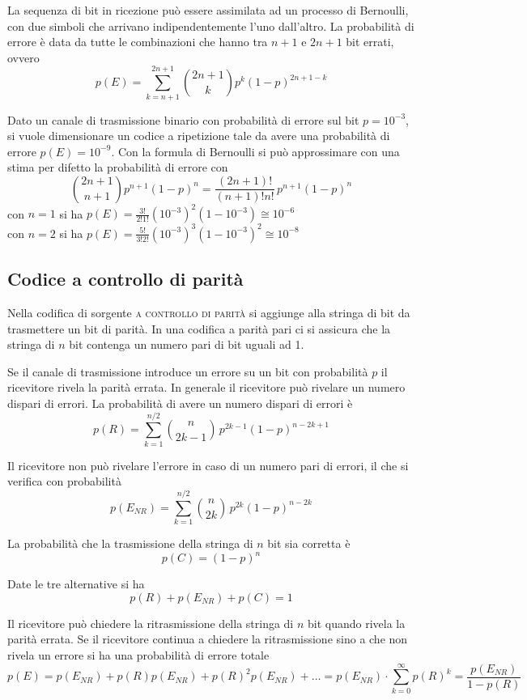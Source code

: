 La sequenza di bit in ricezione può essere assimilata ad un processo di Bernoulli, con due simboli che arrivano indipendentemente l'uno dall'altro. La probabilità di errore è data da tutte le combinazioni che hanno tra $n+1$ e $2n+1$ bit errati, ovvero
\[p(E)=\sum_{k=n+1}^{2n+1}\binom{2n+1}{k}p^k(1-p)^{2n+1-k}\]

\begin{esempio}
Dato un canale di trasmissione binario con probabilità di errore sul bit $p=10^{-3}$, si vuole dimensionare un codice a ripetizione tale da avere una probabilità di errore $p(E)=10^{-9}$.
Con la formula di Bernoulli si può approssimare con una stima per difetto la probabilità di errore con \[\binom{2n+1}{n+1}p^{n+1}(1-p)^n=\frac{(2n+1)!}{(n+1)!n!}\,p^{n+1}(1-p)^n\]
con $n=1$ si ha $p(E)=\frac{3!}{2!1!}(10^{-3})^2(1-10^{-3})\cong 10^{-6}$\\
con $n=2$ si ha $p(E)=\frac{5!}{3!2!}(10^{-3})^3(1-10^{-3})^2\cong 10^{-8}$\\
\end{esempio}

\subsection{Codice a controllo di parità}
Nella codifica di sorgente \textsc{a controllo di parità} si aggiunge alla stringa di bit da trasmettere un bit di parità. In una codifica a parità pari ci si assicura che la stringa di $n$ bit contenga un numero pari di bit uguali ad 1.

Se il canale di trasmissione introduce un errore su un bit con probabilità $p$ il ricevitore rivela la parità errata. In generale il ricevitore può rivelare un numero dispari di errori.
La probabilità di avere un numero dispari di errori è
\[p(R)=\sum_{k=1}^{n/2}\binom{n}{2k-1}\,p^{2k-1}(1-p)^{n-2k+1}\]

Il ricevitore non può rivelare l'errore in caso di un numero pari di errori, il che si verifica con probabilità
\[p(E_{NR})=\sum_{k=1}^{n/2}\binom{n}{2k}\,p^{2k}(1-p)^{n-2k}\]

La probabilità che la trasmissione della stringa di $n$ bit sia corretta è
\[p(C)=(1-p)^n\]

Date le tre alternative si ha
\[p(R)+p(E_{NR})+p(C)=1\]

Il ricevitore può chiedere la ritrasmissione della stringa di $n$ bit quando rivela la parità errata.
Se il ricevitore continua a chiedere la ritrasmissione sino a che non rivela un errore si ha una probabilità di errore totale
\[p(E)=p(E_{NR})+p(R)p(E_{NR})+p(R)^2p(E_{NR})+\dots=p(E_{NR})\cdot\sum_{k=0}^{\infty}p(R)^k=\frac{p(E_{NR})}{1-p(R)}\]

